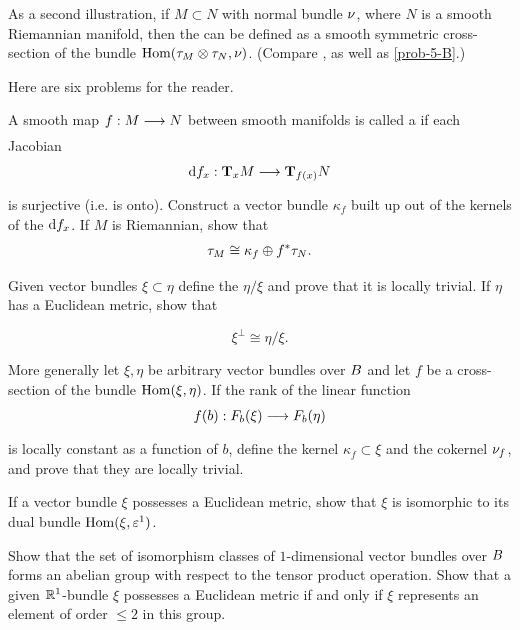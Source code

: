 \documentclass[../main]{subfiles}
\begin{document}
As a second illustration, if $M\subset N$ with normal bundle $\nu_{}$, where $N$ is a smooth Riemannian manifold, then the  can be defined as a smooth symmetric cross-section of the bundle $\operatorname{Hom}(\tau_{M}\otimes\tau_{N}, \nu_{})$.
(Compare \cite{bishop2011}, as well as \ref{prob-5-B}.)

Here are six problems for the reader.

\begin{problem}\label{prob-3-A}
A smooth map $f : M \varrightarrow{}N$ between smooth manifolds is called a  if each Jacobian
\[\differential{f}{x} : \tangentspace{M}{x} \varrightarrow{} \tangentspace{N}{f(x)}
\]
is surjective (i.e. is onto). Construct a vector bundle $\kappa_f$ built up out of the kernels of the $\mathrm{d} f_{x}$. If $M$ is Riemannian, show that
\[
\tau_{M} \cong \kappa_f\oplus f^*\tau_{N}.
\]
\end{problem}

\begin{problem}\label{prob-3-B}
Given vector bundles $\xi\subset\eta$ define the  $\eta/\xi$ and prove that it is locally trivial. If $\eta$ has a Euclidean metric,
show that

\[
\xi^\perp\cong\eta/\xi.
\]

\end{problem}
\begin{problem}\label{prob-3-C}
More generally let $\xi, \eta$ be arbitrary vector bundles over $B$ and let $f$ be a cross-section of the bundle $\operatorname{Hom}(\xi, \eta)$. If the rank of the linear function
\[
f(b) : F_b(\xi) \varrightarrow{} F_b(\eta)
\]
is locally constant as a function of $b$, define the kernel $\kappa_f\subset\xi$ and the cokernel $\nu_{f}$, and prove that they are locally trivial.
\end{problem}


\begin{problem}\label{prob-3-D}
If a vector bundle $\xi$ possesses a Euclidean metric,
show that $\xi$ is isomorphic to its dual bundle $\operatorname{Hom}(\xi, \varepsilon^1)$.
\end{problem}


\begin{problem}\label{prob-3-E}
Show that the set of isomorphism classes of $1$-dimensional vector bundles over $B$ forms an abelian group with respect to the tensor product operation. Show that a given $\mathbb R^1$-bundle $\xi$ possesses a Euclidean metric if and only if $\xi$ represents an element of order $\leq 2$
in this group.
\end{problem}
\end{document}
